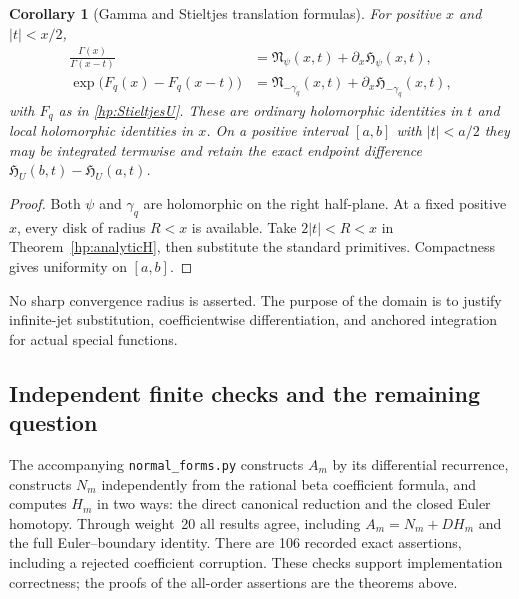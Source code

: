 \documentclass[11pt,a4paper]{article}
\newtheorem{corollary}[theorem]{Corollary}
\theoremstyle{definition}
\theoremstyle{remark}
\numberwithin{equation}{section}
\begin{document}
\begin{corollary}[Gamma and Stieltjes translation formulas]
\label{hp:specialtranslations}
For positive $x$ and $|t|<x/2$,
\begin{align}
 \frac{\Gamma(x)}{\Gamma(x-t)}
     &=\mathfrak N_{\psi}(x,t)
                         +\partial_x\mathfrak H_{\psi}(x,t),
                                                    \label{hp:Gammatrans}\\
 \exp\bigl(F_q(x)-F_q(x-t)\bigr)
     &=\mathfrak N_{-\gamma_q}(x,t)
                         +\partial_x\mathfrak H_{-\gamma_q}(x,t),
                                                    \label{hp:Stieltjestrans}
\end{align}
with $F_q$ as in \eqref{hp:StieltjesU}. These are ordinary
holomorphic identities in $t$ and local holomorphic identities in $x$.
On a positive interval $[a,b]$ with $|t|<a/2$ they may be
integrated termwise and retain the exact endpoint difference
$\mathfrak H_U(b,t)-\mathfrak H_U(a,t)$.
\end{corollary}

\begin{proof}
Both $\psi$ and $\gamma_q$ are holomorphic on the right half-plane.
At a fixed positive $x$, every disk of radius $R<x$ is available.
Take $2|t|<R<x$ in Theorem~\ref{hp:analyticH}, then substitute
the standard primitives. Compactness gives uniformity on $[a,b]$.
\end{proof}

No sharp convergence radius is asserted. The purpose of the domain is
to justify infinite-jet substitution, coefficientwise differentiation,
and anchored integration for actual special functions.

\subsection{Independent finite checks and the remaining question}

The accompanying \texttt{normal\_forms.py} constructs $A_m$ by
its differential recurrence, constructs $N_m$ independently from
the rational beta coefficient formula, and computes $H_m$ in two
ways: the direct canonical reduction and the closed Euler homotopy.
Through weight~20 all results agree, including $A_m=N_m+DH_m$
and the full Euler--boundary identity. There are 106 recorded
exact assertions, including a rejected coefficient corruption.
These checks support implementation correctness; the proofs of
the all-order assertions are the theorems above.
\end{document}
